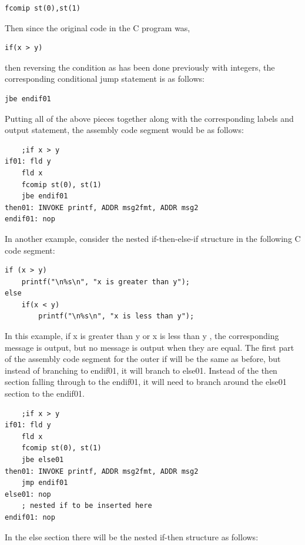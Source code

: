 \documentclass[10pt]{book}
\begin{document}
\begin{verbatim}
fcomip st(0),st(1)
\end{verbatim}

Then since the original code in the C program was,

\begin{verbatim}
if(x > y)
\end{verbatim}

then reversing the condition as has been done previously with integers, the corresponding conditional jump statement is as follows:

\begin{verbatim}
jbe endif01
\end{verbatim}

Putting all of the above pieces together along with the corresponding labels and output statement, the assembly code segment would be as follows:

\begin{verbatim}
    ;if x > y
if01: fld y
    fld x
    fcomip st(0), st(1)
    jbe endif01
then01: INVOKE printf, ADDR msg2fmt, ADDR msg2
endif01: nop
\end{verbatim}

In another example, consider the nested if-then-else-if structure in the following C code segment:

\begin{verbatim}
if (x > y)
    printf("\n%s\n", "x is greater than y");
else
    if(x < y)
        printf("\n%s\n", "x is less than y");
\end{verbatim}

In this example, if x is greater than y or x is less than y , the corresponding message is output, but no message is output when they are equal. The first part of the assembly code segment for the outer if will be the same as before, but instead of branching to endif01, it will branch to else01. Instead of the then section falling through to the endif01, it will need to branch around the else01 section to the endif01.

\begin{verbatim}
    ;if x > y
if01: fld y
    fld x
    fcomip st(0), st(1)
    jbe else01
then01: INVOKE printf, ADDR msg2fmt, ADDR msg2
    jmp endif01
else01: nop
    ; nested if to be inserted here
endif01: nop
\end{verbatim}

In the else section there will be the nested if-then structure as follows:
\end{document}
